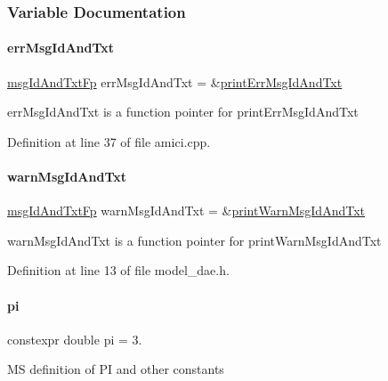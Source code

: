 \subsubsection{Variable Documentation}
\mbox{\label{namespaceamici_a19eefc037cc960b013cc0b724e5292b7}} 
\paragraph{\texorpdfstring{errMsgIdAndTxt}{errMsgIdAndTxt}}
{\footnotesize\ttfamily \mbox{\hyperlink{namespaceamici_a02384ab9af881494db3ed32cd6ecdcc0}{msg\+Id\+And\+Txt\+Fp}} err\+Msg\+Id\+And\+Txt = \&\mbox{\hyperlink{namespaceamici_ade28c6a7f1b5aee40bb2453fb61b4024}{print\+Err\+Msg\+Id\+And\+Txt}}}

err\+Msg\+Id\+And\+Txt is a function pointer for print\+Err\+Msg\+Id\+And\+Txt 

Definition at line 37 of file amici.\+cpp.

\mbox{\label{namespaceamici_adb95b29229e987b4b0a55ade25961688}} 
\paragraph{\texorpdfstring{warnMsgIdAndTxt}{warnMsgIdAndTxt}}
{\footnotesize\ttfamily \mbox{\hyperlink{namespaceamici_a02384ab9af881494db3ed32cd6ecdcc0}{msg\+Id\+And\+Txt\+Fp}} warn\+Msg\+Id\+And\+Txt = \&\mbox{\hyperlink{namespaceamici_a14122f73594a970df27bfcb8fa0db35d}{print\+Warn\+Msg\+Id\+And\+Txt}}}

warn\+Msg\+Id\+And\+Txt is a function pointer for print\+Warn\+Msg\+Id\+And\+Txt 

Definition at line 13 of file model\+\_\+dae.\+h.

\mbox{\label{namespaceamici_ad172e8d1a294401209781f9aeaa77410}} 
\paragraph{\texorpdfstring{pi}{pi}}
{\footnotesize\ttfamily constexpr double pi = 3.}

MS definition of PI and other constants 

